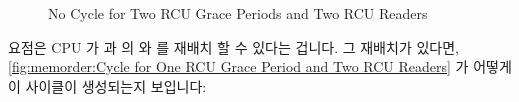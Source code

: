 \begin{figure}[tbp]
\centering
{}
\caption{No Cycle for Two RCU Grace Periods and Two RCU Readers}
\label{fig:memorder:No Cycle for Two RCU Grace Periods and Two RCU Readers}
\end{figure}

요점은 CPU 가  과  의  와 
를 재배치 할 수 있다는 겁니다.
그 재배치가 있다면,
\cref{fig:memorder:Cycle for One RCU Grace Period and Two RCU Readers}
가 어떻게 이 사이클이 생성되는지 보입니다:

